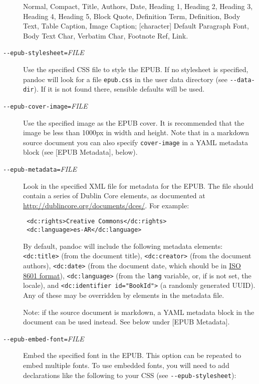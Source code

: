 \documentclass[]{article}
\begin{document}
\begin{description}
Normal, Compact, Title, Authors, Date, Heading 1, Heading 2, Heading 3,
Heading 4, Heading 5, Block Quote, Definition Term, Definition, Body
Text, Table Caption, Image Caption; {[}character{]} Default Paragraph
Font, Body Text Char, Verbatim Char, Footnote Ref, Link.
\item[\texttt{-{}-epub-stylesheet=}\emph{FILE}]
Use the specified CSS file to style the EPUB. If no stylesheet is
specified, pandoc will look for a file \texttt{epub.css} in the user
data directory (see \texttt{-{}-data-dir}). If it is not found there,
sensible defaults will be used.
\item[\texttt{-{}-epub-cover-image=}\emph{FILE}]
Use the specified image as the EPUB cover. It is recommended that the
image be less than 1000px in width and height. Note that in a markdown
source document you can also specify \texttt{cover-image} in a YAML
metadata block (see {[}EPUB Metadata{]}, below).
\item[\texttt{-{}-epub-metadata=}\emph{FILE}]
Look in the specified XML file for metadata for the EPUB. The file
should contain a series of Dublin Core elements, as documented at
\url{http://dublincore.org/documents/dces/}. For example:

\begin{verbatim}
 <dc:rights>Creative Commons</dc:rights>
 <dc:language>es-AR</dc:language>
\end{verbatim}

By default, pandoc will include the following metadata elements:
\texttt{\textless{}dc:title\textgreater{}} (from the document title),
\texttt{\textless{}dc:creator\textgreater{}} (from the document
authors), \texttt{\textless{}dc:date\textgreater{}} (from the document
date, which should be in \href{http://www.w3.org/TR/NOTE-datetime}{ISO
8601 format}), \texttt{\textless{}dc:language\textgreater{}} (from the
\texttt{lang} variable, or, if is not set, the locale), and
\texttt{\textless{}dc:identifier id="BookId"\textgreater{}} (a randomly
generated UUID). Any of these may be overridden by elements in the
metadata file.

Note: if the source document is markdown, a YAML metadata block in the
document can be used instead. See below under {[}EPUB Metadata{]}.
\item[\texttt{-{}-epub-embed-font=}\emph{FILE}]
Embed the specified font in the EPUB. This option can be repeated to
embed multiple fonts. To use embedded fonts, you will need to add
declarations like the following to your CSS (see
\texttt{-{}-epub-stylesheet}):


\end{description}
\end{document}
